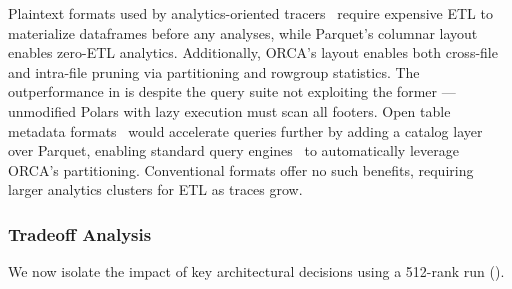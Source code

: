 Plaintext formats used by analytics-oriented tracers~\cite{Devar2024:DFTracer,Boehm2016:Caliper}
require expensive ETL to materialize dataframes before any analyses, while Parquet's columnar
layout enables zero-ETL analytics.
Additionally, ORCA's layout enables both cross-file and intra-file
pruning via partitioning and rowgroup statistics.
The outperformance in  is despite the query suite not exploiting the former ---
unmodified Polars with lazy execution must scan all footers.
Open table metadata formats~\cite{:Iceberg,Armbr2020:Deltalake} would accelerate queries further by
adding a catalog layer over Parquet, enabling standard query
engines~\cite{:Polars,Raasv2019:DuckDB} to automatically leverage ORCA's partitioning.
Conventional formats offer no such benefits, requiring larger analytics clusters for ETL as traces grow.

\subsubsection{Tradeoff Analysis}\label{sec:orca:eval-trace-tradeoffs}

\figEvalArch{}
We now isolate the impact of key architectural decisions using a 512-rank run
().


